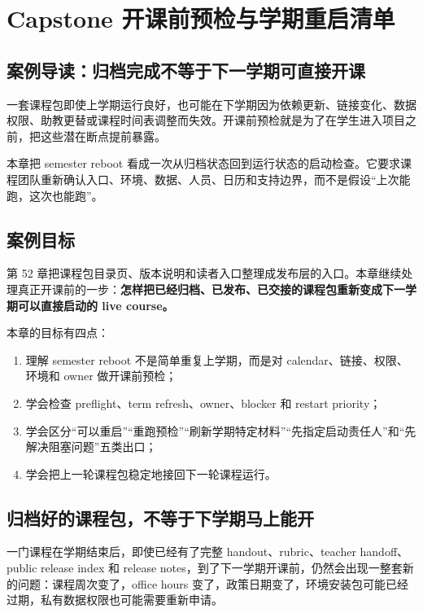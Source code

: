 \chapter{Capstone 开课前预检与学期重启清单}

\section{案例导读：归档完成不等于下一学期可直接开课}

一套课程包即使上学期运行良好，也可能在下学期因为依赖更新、链接变化、数据权限、助教更替或课程时间表调整而失效。开课前预检就是为了在学生进入项目之前，把这些潜在断点提前暴露。

本章把 semester reboot 看成一次从归档状态回到运行状态的启动检查。它要求课程团队重新确认入口、环境、数据、人员、日历和支持边界，而不是假设“上次能跑，这次也能跑”。

\section{案例目标}

第 52 章把课程包目录页、版本说明和读者入口整理成发布层的入口。本章继续处理真正开课前的一步：\textbf{怎样把已经归档、已发布、已交接的课程包重新变成下一学期可以直接启动的 live course。}

本章的目标有四点：

\begin{enumerate}
    \item 理解 semester reboot 不是简单重复上学期，而是对 calendar、链接、权限、环境和 owner 做开课前预检；
    \item 学会检查 preflight、term refresh、owner、blocker 和 restart priority；
    \item 学会区分“可以重启”“重跑预检”“刷新学期特定材料”“先指定启动责任人”和“先解决阻塞问题”五类出口；
    \item 学会把上一轮课程包稳定地接回下一轮课程运行。
\end{enumerate}

\section{归档好的课程包，不等于下学期马上能开}

一门课程在学期结束后，即使已经有了完整 handout、rubric、teacher handoff、public release index 和 release notes，到了下一学期开课前，仍然会出现一整套新的问题：课程周次变了，office hours 变了，政策日期变了，环境安装包可能已经过期，私有数据权限也可能需要重新申请。

